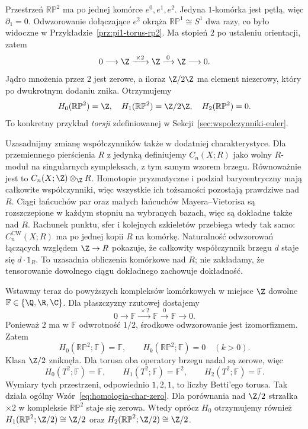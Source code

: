 \begin{przyklad}
\label{prz:homologia-rp2}
Przestrzeń $\mathbb{RP}^2$
ma po jednej komórce
$e^0,e^1,e^2$.
Jedyna $1$-komórka jest pętlą,
więc $\partial_1=0$.
Odwzorowanie dołączające $e^2$
okrąża $\mathbb{RP}^1\cong S^1$
dwa razy, co było widoczne
w Przykładzie~\ref{prz:pi1-torus-rp2}.
Ma stopień $2$ po ustaleniu
orientacji, zatem
\[
 0\longrightarrow\Z
 \xrightarrow{\;\times2\;}\Z
 \xrightarrow{\;0\;}\Z
 \longrightarrow0.
\]
Jądro mnożenia przez $2$
jest zerowe, a iloraz
$\Z/2\Z$ ma element
niezerowy, który po
dwukrotnym dodaniu znika.
Otrzymujemy
\[
 H_0(\mathbb{RP}^2)=\Z,\quad
 H_1(\mathbb{RP}^2)=\Z/2\Z,\quad
 H_2(\mathbb{RP}^2)=0.
\]
To konkretny przykład \emph{torsji}
zdefiniowanej w
Sekcji~\ref{sec:wspolczynniki-euler}.
\end{przyklad}

\begin{uwaga}
\label{rem:homologia-wspolczynniki-przestrzeni}
Uzasadnijmy zmianę współczynników także w dodatniej charakterystyce.
Dla przemiennego pierścienia $R$ z jedynką definiujemy $C_n(X;R)$
jako wolny $R$-moduł na singularnych sympleksach, z tym samym wzorem brzegu.
Równoważnie jest to $C_n(X;\Z)\otimes_{\Z}R$.
Homotopie pryzmatyczne i podział barycentryczny mają całkowite współczynniki,
więc wszystkie ich tożsamości pozostają prawdziwe nad $R$.
Ciągi łańcuchów par oraz małych łańcuchów Mayera--Vietorisa są
rozszczepione w każdym stopniu na wybranych bazach, więc są dokładne także nad $R$.
Rachunek punktu, sfer i kolejnych szkieletów przebiega wtedy tak samo:
$C_n^{\mathrm{CW}}(X;R)$ ma po jednej kopii $R$ na komórkę.
Naturalność odwzorowań łączących względem $\Z\to R$ pokazuje,
że całkowity współczynnik brzegu $d$ staje się $d\cdot1_R$.
To uzasadnia obliczenia komórkowe nad $R$; nie zakładamy,
że tensorowanie dowolnego ciągu dokładnego zachowuje dokładność.
\end{uwaga}

\begin{przyklad}
\label{prz:zmiana-wspolczynnikow-rp2-torus}
Wstawmy teraz do powyższych kompleksów komórkowych
w miejsce $\Z$ dowolne
$\mathbb F\in\{\Q,\R,\C\}$.
Dla płaszczyzny rzutowej dostajemy
\[
 0\longrightarrow\mathbb F
 \xrightarrow{\;\times2\;}\mathbb F
 \xrightarrow{\;0\;}\mathbb F
 \longrightarrow0.
\]
Ponieważ $2$ ma w $\mathbb F$ odwrotność
$1/2$, środkowe odwzorowanie jest
izomorfizmem. Zatem
\[
 H_0(\mathbb{RP}^2;\mathbb F)=\mathbb F,
 \qquad H_k(\mathbb{RP}^2;\mathbb F)=0\quad(k>0).
\]
Klasa $\Z/2$ zniknęła. Dla torusa oba
operatory brzegu nadal są zerowe, więc
\[
 H_0(T^2;\mathbb F)=\mathbb F,\qquad
 H_1(T^2;\mathbb F)=\mathbb F^2,\qquad
 H_2(T^2;\mathbb F)=\mathbb F.
\]
Wymiary tych przestrzeni, odpowiednio
$1,2,1$, to liczby Betti'ego torusa.
Tak działa ogólny
Wzór~\eqref{eq:homologia-char-zero}.
Dla porównania nad $\Z/2$ strzałka
$\times2$ w kompleksie $\mathbb{RP}^2$
staje się zerowa. Wtedy oprócz $H_0$
otrzymujemy również
$H_1(\mathbb{RP}^2;\Z/2)\cong\Z/2$
oraz $H_2(\mathbb{RP}^2;\Z/2)\cong\Z/2$.
\end{przyklad}

